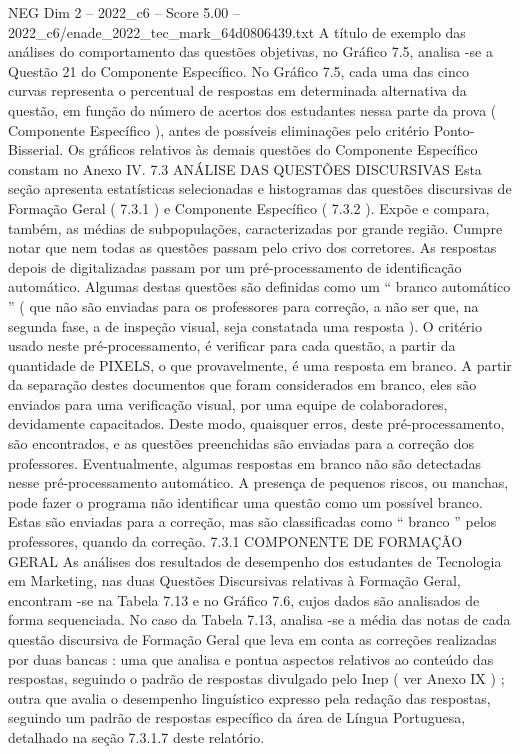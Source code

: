 \begin{textsample}{NEG Dim 2 – 2022\_c6 – Score 5.00 – 2022\_c6/enade\_2022\_tec\_mark\_64d0806439.txt}
A título de exemplo das análises do comportamento das questões objetivas, no Gráfico 7.5, analisa -se a Questão 21 do Componente Específico.
No Gráfico 7.5, cada uma das cinco curvas representa o percentual de respostas em determinada alternativa da questão, em função do número de acertos dos estudantes nessa parte da prova ( Componente Específico ), antes de possíveis eliminações pelo critério Ponto-Bisserial.
Os gráficos relativos às demais questões do Componente Específico constam no Anexo IV. 7.3 ANÁLISE DAS QUESTÕES DISCURSIVAS Esta seção apresenta estatísticas selecionadas e histogramas das questões discursivas de Formação Geral ( 7.3.1 ) e Componente Específico ( 7.3.2 ).
Expõe e compara, também, as médias de subpopulações, caracterizadas por grande região.
Cumpre notar que nem todas as questões passam pelo crivo dos corretores.
As respostas depois de digitalizadas passam por um pré-processamento de identificação automático.
Algumas destas questões são definidas como um “ branco automático ” ( que não são enviadas para os professores para correção, a não ser que, na segunda fase, a de inspeção visual, seja constatada uma resposta ).
O critério usado neste pré-processamento, é verificar para cada questão, a partir da quantidade de PIXELS, o que provavelmente, é uma resposta em branco.
A partir da separação destes documentos que foram considerados em branco, eles são enviados para uma verificação visual, por uma equipe de colaboradores, devidamente capacitados.
Deste modo, quaisquer erros, deste pré-processamento, são encontrados, e as questões preenchidas são enviadas para a correção dos professores.
Eventualmente, algumas respostas em branco não são detectadas nesse pré-processamento automático.
A presença de pequenos riscos, ou manchas, pode fazer o programa não identificar uma questão como um possível branco.
Estas são enviadas para a correção, mas são classificadas como “ branco ” pelos professores, quando da correção. 7.3.1 COMPONENTE DE FORMAÇÃO GERAL As análises dos resultados de desempenho dos estudantes de Tecnologia em Marketing, nas duas Questões Discursivas relativas à Formação Geral, encontram -se na Tabela 7.13 e no Gráfico 7.6, cujos dados são analisados de forma sequenciada.
No caso da Tabela 7.13, analisa -se a média das notas de cada questão discursiva de Formação Geral que leva em conta as correções realizadas por duas bancas : uma que analisa e pontua aspectos relativos ao conteúdo das respostas, seguindo o padrão de respostas divulgado pelo Inep ( ver Anexo IX ) ; outra que avalia o desempenho linguístico expresso pela redação das respostas, seguindo um padrão de respostas específico da área de Língua Portuguesa, detalhado na seção 7.3.1.7 deste relatório.

\end{textsample}
